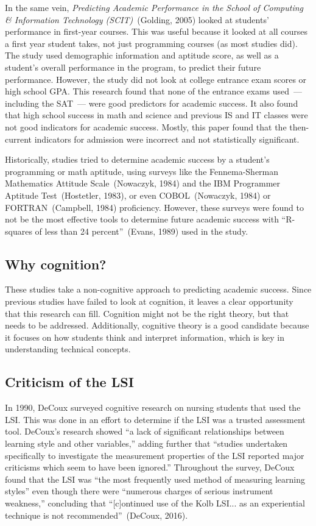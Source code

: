 In the same vein, \textit{Predicting Academic Performance in the School of Computing \& Information Technology (SCIT)}~(Golding, 2005) looked at students' performance in first-year courses. This was useful because it looked at all courses a first year student takes, not just programming courses (as most studies did). The study used demographic information and aptitude score, as well as a student's overall performance in the program, to predict their future performance. However, the study did not look at college entrance exam scores or high school GPA. This research found that none of the entrance exams used~--- including the SAT~--- were good predictors for academic success. It also found that high school success in math and science and previous IS and IT classes were not good indicators for academic success. Mostly, this paper found that the then-current indicators for admission were incorrect and not statistically significant.

Historically, studies tried to determine academic success by a student's programming or math aptitude, using surveys like the Fennema-Sherman Mathematics Attitude Scale~(Nowaczyk, 1984) and the IBM Programmer Aptitude Test~(Hostetler, 1983), or even COBOL~(Nowaczyk, 1984) or FORTRAN~(Campbell, 1984) proficiency. However, these surveys were found to not be the most effective tools to determine future academic success with ``R-squares of less than 24 percent''~(Evans, 1989) used in the study.

\subsection{Why cognition?}
These studies take a non-cognitive approach to predicting academic success. Since previous studies have failed to look at cognition, it leaves a clear opportunity that this research can fill. Cognition might not be the right theory, but that needs to be addressed. Additionally, cognitive theory is a good candidate because it focuses on how students think and interpret information, which is key in understanding technical concepts.

\subsection{Criticism of the LSI}
In 1990, DeCoux surveyed cognitive research on nursing students that used the LSI. This was done in an effort to determine if the LSI was a trusted assessment tool. DeCoux's research showed ``a lack of significant relationships between learning style and other variables,'' adding further that ``studies undertaken specifically to investigate the measurement properties of the LSI reported major criticisms which seem to have been ignored.'' Throughout the survey, DeCoux found that the LSI was ``the most frequently used method of measuring learning styles'' even though there were ``numerous charges of serious instrument weakness,'' concluding that ``[c]ontinued use of the Kolb LSI... as an experiential technique is not recommended''~(DeCoux, 2016).

